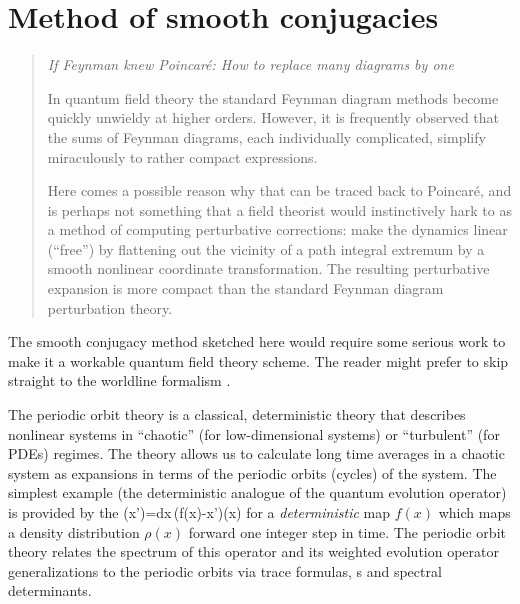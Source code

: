 
\section{Method of smooth conjugacies}
\label{sect:scfpo}

\begin{quote}
\emph{If Feynman knew Poincar\'e: How to replace many diagrams by one}

In quantum field theory the standard Feynman diagram methods become
quickly unwieldy at higher orders. However,
it is frequently observed that the sums of Feynman diagrams, each
individually complicated, simplify miraculously to rather compact
expressions.

Here comes a possible reason why that can be traced back to Poincar\'e,
and is perhaps not something that a field theorist would instinctively
hark to as a method of computing perturbative corrections: make the
dynamics linear (``free'') by flattening out the vicinity of a path
integral extremum by a smooth nonlinear coordinate transformation.
The resulting perturbative expansion is more compact than the standard
Feynman diagram perturbation theory.
\end{quote}

\noindent
The smooth conjugacy method sketched here would require some serious work
to make it a workable quantum field theory scheme. The reader might
prefer to skip straight to the worldline formalism
.

The periodic orbit theory is a classical, deterministic
theory that describes nonlinear systems in ``chaotic'' (for
low-dimensional systems) or ``turbulent'' (for PDEs) regimes. The theory
allows us to calculate long time averages in a chaotic system as
expansions in terms of the periodic orbits (cycles) of the system. The
simplest example (the deterministic analogue of the quantum evolution
operator) is provided by the {\FPoper}
\beq
\Lop \rho(x')=\int\!\!dx\,\delta(f(x)-x')\rho(x)
for a {\em deterministic} map $f(x)$ which maps a density distribution
$\rho(x)$ forward one integer step in time. The periodic orbit theory relates the spectrum
of this operator and its weighted evolution operator generalizations to
the periodic orbits via trace formulas, \dzeta s and spec\-tral
det\-er\-min\-ants.

